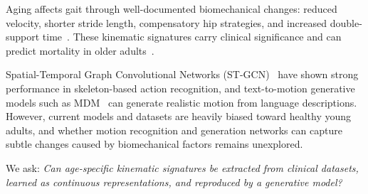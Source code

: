 Aging affects gait through well-documented biomechanical changes: reduced velocity, shorter stride length, compensatory hip strategies, and increased double-support time~\cite{boyer2023nia, studenski2011gait}. These kinematic signatures carry clinical significance and can predict mortality in older adults~\cite{studenski2011gait}.

Spatial-Temporal Graph Convolutional Networks (ST-GCN)~\cite{yan2018stgcn} have shown strong performance in skeleton-based action recognition, and text-to-motion generative models such as MDM~\cite{tevet2023human} can generate realistic motion from language descriptions. However, current models and datasets are heavily biased toward healthy young adults, and whether motion recognition and generation networks can capture subtle changes caused by biomechanical factors remains unexplored.

We ask: \emph{Can age-specific kinematic signatures be extracted from clinical datasets, learned as continuous representations, and reproduced by a generative model?}

